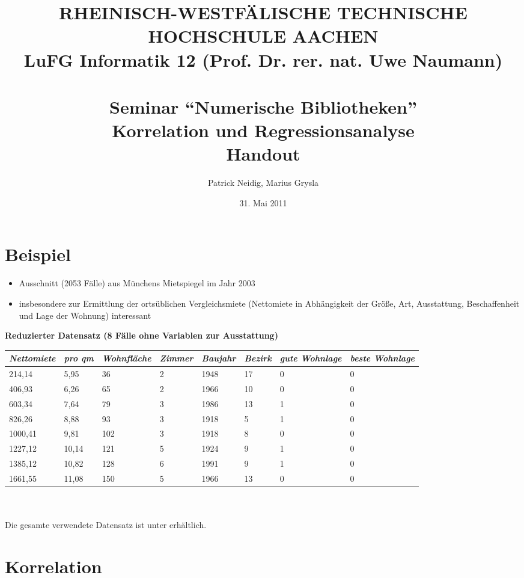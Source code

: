 \documentclass[a4paper]{article}
\title{
{\bf \scriptsize RHEINISCH-WESTF\"ALISCHE TECHNISCHE HOCHSCHULE AACHEN \\
LuFG Informatik 12 (Prof. Dr. rer. nat. Uwe Naumann)}\\
~\\
Seminar ``Numerische Bibliotheken''\\
{\bf \Large Korrelation und Regressionsanalyse} \\
{\large Handout} 
}
\author{Patrick Neidig, Marius Grysla}
\date{31. Mai 2011}
\begin{document}
\maketitle

\section*{Beispiel}
\begin{itemize}
	\item Ausschnitt (2053 Fälle) aus Münchens Mietspiegel im Jahr 2003
	\item insbesondere zur Ermittlung der ortsüblichen Vergleichsmiete (Nettomiete in Abhängigkeit der Größe, Art, Ausstattung, Beschaffenheit und Lage der Wohnung) interessant
\end{itemize}

\par \textbf{Reduzierter Datensatz (8 Fälle ohne Variablen zur Ausstattung)}\\
	
	\begin{tabular}[ht]{|l|l|l|l|l|l|l|l|}
  	\hline
  	\textit{Nettomiete} & \textit{pro qm} & \textit{Wohnfläche} & \textit{Zimmer} & \textit{Baujahr} & \textit{Bezirk} & \textit{gute Wohnlage} & \textit{beste Wohnlage}\\
  	\hline \hline
  	214,14 & 5,95 & 36 & 2 & 1948 & 17 & 0 & 0\\ \hline
  	406,93 & 6,26 & 65 & 2 & 1966 & 10 & 0 & 0\\ \hline
		603,34 & 7,64 & 79 & 3 & 1986 & 13 & 1 & 0\\ \hline
		826,26 & 8,88 & 93 & 3 & 1918 & 5 & 1 &0\\ \hline
		1000,41 & 9,81 & 102 & 3 & 1918 & 8 & 0 & 0\\ \hline
		1227,12 & 10,14 & 121 & 5 & 1924 & 9 & 1 & 0\\ \hline
		1385,12 & 10,82 & 128 & 6 & 1991 & 9 & 1 & 0\\ \hline
		1661,55 & 11,08 & 150 & 5 & 1966 & 13 & 0 & 0\\
  	\hline
	\end{tabular} \\\\

Die gesamte verwendete Datensatz ist unter \cite{Fahrmeier2011} erhältlich.

\section*{Korrelation}
\end{document}
